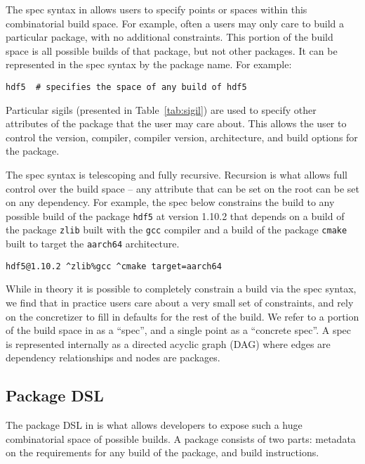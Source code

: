 The spec syntax in \spack{} allows users to specify points or spaces within this combinatorial build space. For example, often a users may only care to build a particular package, with no additional constraints. This portion of the build space is all possible builds of that package, but not other packages. It can be represented in the spec syntax by the package name. For example:
\begin{verbatim}
hdf5  # specifies the space of any build of hdf5
\end{verbatim}
Particular sigils (presented in Table~\ref{tab:sigil}) are used to specify other attributes of the package that the user may care about. This allows the user to control the version, compiler, compiler version, architecture, and build options for the package.



The spec syntax is telescoping and fully recursive. Recursion is what allows full control over the build space -- any attribute that can be set on the root can be set on any dependency. For example, the spec below constrains the build to any possible build of the package \texttt{hdf5} at version 1.10.2 that depends on a build of the package \texttt{zlib} built with the \texttt{gcc} compiler and a build of the package \texttt{cmake} built to target the \texttt{aarch64} architecture.
\begin{verbatim}
hdf5@1.10.2 ^zlib%gcc ^cmake target=aarch64
\end{verbatim}

While in theory it is possible to completely constrain a build via the spec syntax, we find that in practice users care about a very small set of constraints, and rely on the concretizer to fill in defaults for the rest of the build. We refer to a portion of the build space in \spack{} as a ``spec'', and a single point as a ``concrete spec''. A spec is represented internally as a directed acyclic graph (DAG) where edges are dependency relationships and nodes are packages.

\subsection{Package DSL}
\label{subsec:pack-dsl}

The package DSL in \spack{} is what allows developers to expose such a huge combinatorial space of possible builds. A \spack{} package consists of two parts: metadata on the requirements for any build of the package, and build instructions.

